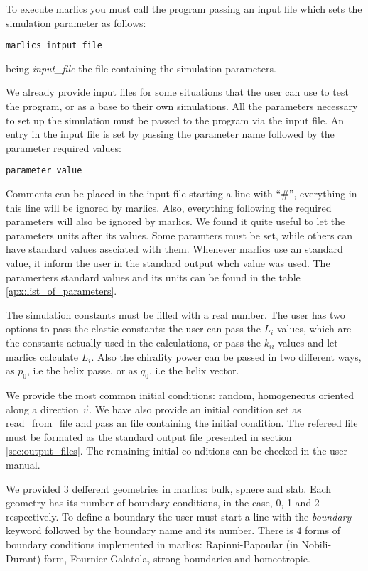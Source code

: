 \documentclass[final,5p,times,twocolumn]{elsarticle}
\begin{document}
To execute marlics you must call the program passing an input file
which sets the simulation parameter as follows:
\begin{lstlisting}
marlics intput_file
\end{lstlisting}
being \textit{input\_file} the file containing the simulation
parameters.

We already provide input files for some situations that the user can
use to test the program, or as a base to their own simulations. All
the parameters necessary to set up the simulation must be passed to
the program via the input file. An entry in the input file is set by passing the parameter name
followed by the parameter required values:
\begin{lstlisting}
parameter value
\end{lstlisting}
Comments can be placed in the input file starting a line with ``\#'',
everything in this line will be ignored by marlics. Also, everything
following the required parameters will also be ignored by marlics. We
found it quite useful to let the parameters units after its values. Some paramters must be set, while others can have standard values assciated with them. Whenever marlics use an standard value, it inform the user in the standard output whch value was used.
The paramerters standard values and its  units can be found in the table \ref{apx:list_of_parameters}.

The simulation constants must be filled with a real number. The user has two options to pass the elastic constants: the user can pass the $L_i$ values, which are the constants actually used in the calculations, or pass the $k_{ii}$ values and let marlics calculate $L_i$. 
Also the chirality power can be passed in two different ways, as $p_0$, i.e the helix passe, or as $q_0$, i.e the helix vector.

We provide the most common initial conditions: random, homogeneous oriented along a direction $\vec{v}$. We have also provide an initial condition set as read\_from\_file and pass an file containing the initial condition. The refereed file must be formated as the standard output file presented in section \ref{sec:output_files}. The remaining initial co nditions can be checked in the user manual.

We provided 3 defferent geometries in marlics: bulk, sphere and slab. Each geometry has its number of boundary conditions, in the case, 0, 1 and 2 respectively. To define a boundary the user must start a line with the \textit{boundary} keyword followed by the boundary name and its number. There is 4 forms of boundary conditions implemented in marlics: Rapinni-Papoular (in Nobili-Durant) form, Fournier-Galatola, strong boundaries and homeotropic.
\end{document}
